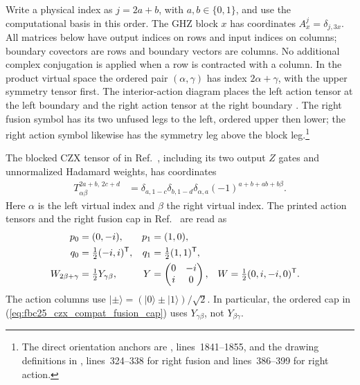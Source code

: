 \documentclass{article}
\begin{document}
Write a physical index as $j=2a+b$, with $a,b\in\{0,1\}$, and use the computational basis in this order. The GHZ block $x$ has coordinates $A_x^j=\delta_{j,3x}$. All matrices below have output indices on rows and input indices on columns; boundary covectors are rows and boundary vectors are columns. No additional complex conjugation is applied when a row is contracted with a column. In the product virtual space the ordered pair $(\alpha,\gamma)$ has index $2\alpha+\gamma$, with the upper symmetry tensor first. The interior-action diagram places the left action tensor at the left boundary and the right action tensor at the right boundary
\cite[lines~1841--1855]{FrancoRubio2025MPUGauging}. The right fusion symbol has its two unfused legs to the left, ordered upper then lower; the right action symbol likewise has the symmetry leg above the block leg.\footnote{The direct orientation anchors are
    , lines~1841--1855, and the drawing definitions in
    , lines~324--338 for right fusion and lines~386--399 for right action.}

The blocked CZX tensor of  in
Ref.~\cite[lines~4505--4547]{FrancoRubio2025MPUGauging}, including its two output $Z$ gates and unnormalized Hadamard weights, has coordinates
\begin{align}
    T^{2a+b,\,2c+d}_{\alpha\beta}
     & =\delta_{a,1-c}\delta_{b,1-d}\delta_{\alpha,a}
    (-1)^{a+b+ab+b\beta}.
    \label{eq:fbc25_czx_compat_blocked_tensor}
\end{align}
Here $\alpha$ is the left virtual index and $\beta$ the right virtual index. The printed action tensors and the right fusion cap in
Ref.~\cite[lines~4671--4694]{FrancoRubio2025MPUGauging} are read as
\begin{align}
    p_0               & =(0,-i),                     & p_1                                     & =(1,0), \notag                     \\
    q_0               & =\tfrac12(-i,i)^{\mathsf T}, & q_1                                     & =\tfrac12(1,1)^{\mathsf T}, \notag \\
    W_{2\beta+\gamma} & =\tfrac12Y_{\gamma\beta},
                      & Y                            & =\begin{pmatrix}0&-i\\i&0\end{pmatrix},
                      & W                            & =\tfrac12(0,i,-i,0)^{\mathsf T}.
    \label{eq:fbc25_czx_compat_fusion_cap}
\end{align}
The action columns use $|\pm\rangle=(|0\rangle\pm|1\rangle)/\sqrt2$. In particular, the ordered cap in
(\ref{eq:fbc25_czx_compat_fusion_cap}) uses $Y_{\gamma\beta}$, not $Y_{\beta\gamma}$.
\end{document}
